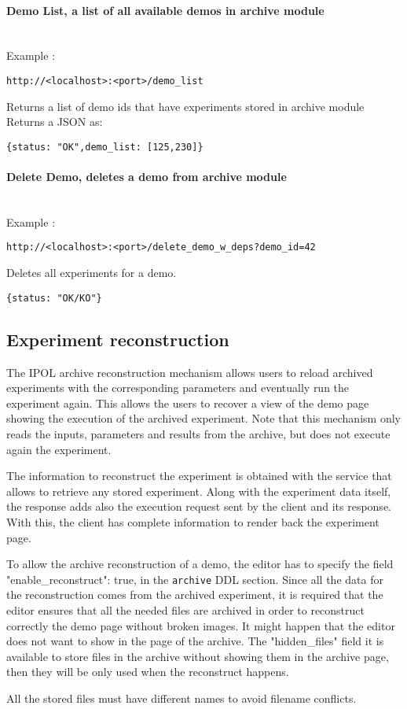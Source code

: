 \paragraph{Demo List, a list of all available demos in archive module} \hspace{0pt} \\
Example :
\begin{verbatim}
http://<localhost>:<port>/demo_list
\end{verbatim}
Returns a list of demo ids that have experiments stored in archive module
Returns a  JSON as:
\begin{verbatim}
{status: "OK",demo_list: [125,230]}
\end{verbatim} 


\paragraph{Delete Demo, deletes a demo from archive module} \hspace{0pt} \\
Example :
\begin{verbatim}
http://<localhost>:<port>/delete_demo_w_deps?demo_id=42
\end{verbatim}
Deletes all experiments for a demo.
\begin{verbatim}
{status: "OK/KO"}
\end{verbatim} 

\subsection{Experiment reconstruction}
The IPOL archive reconstruction mechanism allows users to reload archived experiments with the corresponding parameters and eventually run the experiment again. This allows the users to recover a view of the demo page showing the execution of the archived experiment. Note that this mechanism only reads the inputs, parameters and results from the archive, but does not execute again the experiment. 

The information to reconstruct the experiment is obtained with the service that allows to retrieve any stored experiment. Along with the experiment data itself, the response adds also the execution request sent by the client and its response. With this, the client has complete information to render back the experiment page.

To allow the archive reconstruction of a demo, the editor has to specify the field "enable\_reconstruct": true, in the {\tt archive} DDL section. Since all the data for the reconstruction comes from the archived experiment, it is required that the editor ensures that all the needed files are archived in order to reconstruct correctly the demo page without broken images. It might happen that the editor does not want to show in the page of the archive. The "hidden\_files" field it is available to store files in the archive without showing them in the archive page, then they will be only used when the reconstruct happens.

All the stored files must have different names to avoid filename conflicts. 